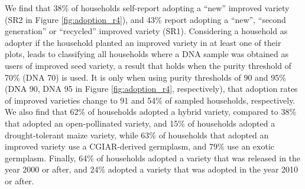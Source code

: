 \documentclass[11pt]{article}
\begin{document}
We find that 38\% of households self-report adopting a “new” improved variety (SR2 in Figure \ref{fig:adoption_r4}), and 43\% report adopting a “new”, “second generation” or “recycled” improved variety (SR1). Considering a household as adopter if the household planted an improved variety in at least one of their plots, leads to classifying all households where a DNA sample was obtained as users of improved seed variety, a result that holds when the purity threshold of 70\% (DNA 70) is used. It is only when using purity thresholds of 90 and 95\% (DNA 90, DNA 95 in Figure \ref{fig:adoption_r4}, respectively), that adoption rates of improved varieties change to 91 and 54\% of sampled households, respectively. We also find that 62\% of households adopted a hybrid variety, compared to 38\% that adopted an open-pollinated variety, and 15\% of households adopted a drought-tolerant maize variety, while 63\% of households that adopted an improved variety use a CGIAR-derived germplasm, and 79\% use an exotic germplasm. Finally, 64\% of households adopted a variety that was released in the year 2000 or after, and 24\% adopted a variety that was adopted in the year 2010 or after.
\end{document}
